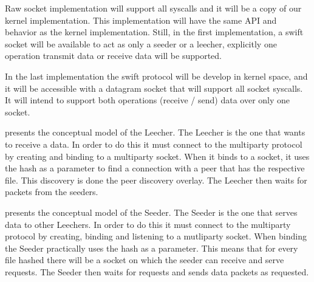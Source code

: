 Raw socket implementation will support all syscalls and it will be a copy of our kernel implementation. 
This implementation will have the same API and behavior as the kernel implementation. Still, in the first
implementation, a swift socket will be available to act as only a seeder or a leecher, explicitly one operation transmit
data or receive data will be supported.
 
In the last implementation the swift protocol will be develop in kernel space, and it will be accessible with a
datagram socket that will support all socket syscalls. It will intend to support both operations (receive / send) data
over only one socket.


 presents the conceptual model of the Leecher. The Leecher is the one that wants
to receive a data. In order to do this it must connect to the multiparty protocol by creating and binding to a
multiparty socket. When it binds to a socket, it uses the hash as a parameter to find a connection with a peer that
has the respective file. This discovery is done the peer discovery overlay. The Leecher then waits for packets
from the seeders.
 



 presents the conceptual model of the Seeder. The Seeder is the one that serves
data to other Leechers. In order to do this it must connect to the multiparty protocol by creating, binding and
listening to a mutliparty socket. When binding the Seeder practically uses the hash as a parameter. This means that
for every file hashed there will be a socket on which the seeder can receive and serve requests. The Seeder then waits
for requests and sends data packets as requested.




